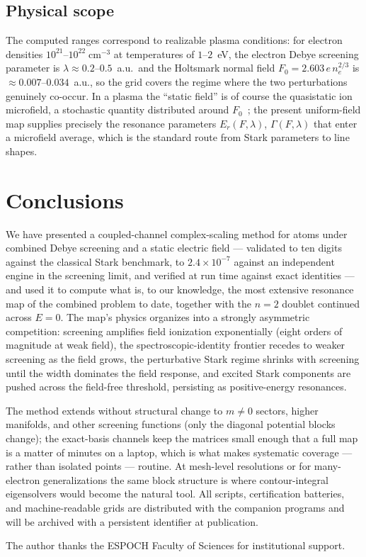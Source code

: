 \documentclass[aps,pra,twocolumn,superscriptaddress,floatfix,longbibliography]{revtex4-2}
\begin{document}
\subsection{Physical scope}

The computed ranges correspond to realizable plasma conditions: for
electron densities $10^{21}$--$10^{22}\;\mathrm{cm}^{-3}$ at
temperatures of $1$--$2$~eV, the electron Debye screening parameter
is $\lambda\approx0.2$--$0.5$~a.u.\ and the Holtsmark normal field
$F_{0}=2.603\,e\,n_e^{2/3}$ is $\approx0.007$--$0.034$~a.u., so the
grid covers the regime where the two perturbations genuinely
co-occur. In a plasma the ``static field'' is of course the
quasistatic ion microfield, a stochastic quantity distributed around
$F_{0}$~\cite{Griem1974}; the present uniform-field map supplies
precisely the resonance parameters $E_r(F,\lambda)$,
$\Gamma(F,\lambda)$ that enter a microfield average, which is the
standard route from Stark parameters to line shapes.

\section{Conclusions}

We have presented a coupled-channel complex-scaling method for atoms
under combined Debye screening and a static electric field ---
validated to ten digits against the classical Stark benchmark, to
$2.4\times10^{-7}$ against an independent engine in the screening
limit, and verified at run time against exact identities --- and used
it to compute what is, to our knowledge, the most extensive resonance
map of the combined problem to date, together with the $n=2$ doublet
continued across $E=0$. The map's physics organizes into a strongly
asymmetric competition: screening amplifies field ionization
exponentially (eight orders of magnitude at weak field), the
spectroscopic-identity frontier recedes to weaker screening as the
field grows, the perturbative Stark regime shrinks with screening
until the width dominates the field response, and excited Stark
components are pushed across the field-free threshold, persisting as
positive-energy resonances.

The method extends without structural change to $m\neq0$ sectors,
higher manifolds, and other screening functions (only the diagonal
potential blocks change); the exact-basis channels keep the matrices
small enough that a full map is a matter of minutes on a laptop,
which is what makes systematic coverage --- rather than isolated
points --- routine. At mesh-level resolutions or for many-electron
generalizations the same block structure is where contour-integral
eigensolvers would become the natural tool. All scripts,
certification batteries, and machine-readable grids are distributed
with the companion programs and will be archived with a persistent
identifier at publication.

\begin{acknowledgments}
The author thanks the ESPOCH Faculty of Sciences for institutional
support.
\end{acknowledgments}


\end{document}
